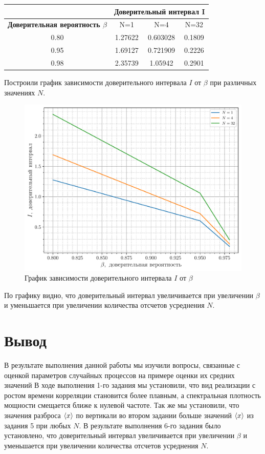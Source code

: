 \begin{table}[htbp]
	\centering
	\begin{tabular}{|c|c|c|c|}
		\toprule
		\multicolumn{1}{|c|}{} & \multicolumn{3}{c|}{Доверительный интервал I} \\
		\midrule
		\textbf{Доверительная вероятность $\beta$} & N=1 & N=4 & N=32 \\
		\midrule
		0.80  & 1.27622 & 0.603028 & 0.1809 \\
		\midrule
		0.95  & 1.69127 & 0.721909 & 0.2226 \\
		\midrule
		0.98  & 2.35739 & 1.05942  & 0.2901 \\
		\bottomrule
	\end{tabular}%
\end{table}%
Построили график зависимости доверительного интервала $I$ от $\beta$ при различных значениях $N$.
 \begin{figure}[H]
	\centering
    \includegraphics[width=0.8\linewidth]{fig/plot1}
	\caption*{График зависимости доверительного интервала $I$ от $\beta$}
\end{figure}
По графику видно, что доверительный интервал увеличивается при увеличении $\beta$ и уменьшается при увеличении количества отсчетов усреднения $N$.
\section{Вывод}
В результате выполнения данной работы мы изучили вопросы, связанные с оценкой параметров случайных процессов на примере оценки их средних значений
В ходе выполнения 1-го задания мы установили, что вид реализации с ростом времени корреляции становится более плавным, а спектральная плотность мощности смещается ближе к нулевой частоте.
Так же мы установили, что значения разброса $\langle x\rangle$ по вертикали во втором задании больше значений $\langle x\rangle$ из задания 5 при любых $N$.
В результате выполнения 6-го задания было установлено, что доверительный интервал увеличивается при увеличении $\beta$ и уменьшается при увеличении количества отсчетов усреднения $N$.


